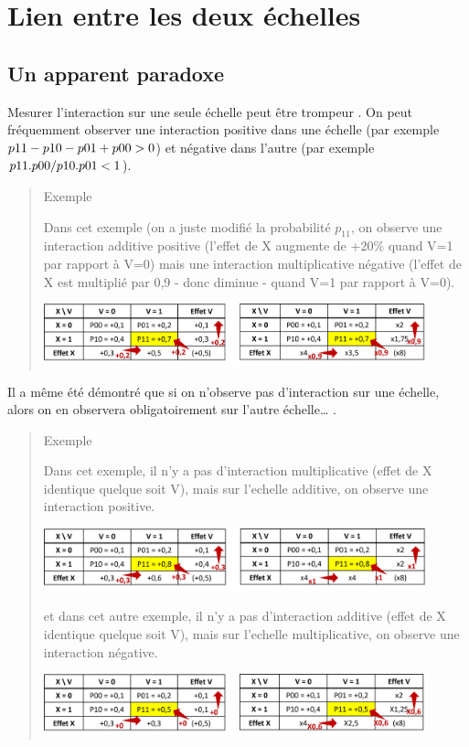 \documentclass[
]{book}
\begin{document}
\hypertarget{lien-entre-les-deux-uxe9chelles}{%
\section{Lien entre les deux échelles}\label{lien-entre-les-deux-uxe9chelles}}

\hypertarget{un-apparent-paradoxe}{%
\subsection*{Un apparent paradoxe}\label{un-apparent-paradoxe}}

Mesurer l'interaction sur une seule échelle peut être trompeur \citet{mathur2018r}. On peut fréquemment observer une interaction positive dans une échelle (par exemple \(\small p11 - p10 - p01 + p00 > 0\)) et négative dans l'autre (par exemple \(\small p11.p00 / p10.p01 <1\)).

\begin{quote}
Exemple

Dans cet exemple (on a juste modifié la probabilité \(p_{11}\), on observe une interaction additive positive (l'effet de X augmente de +20\% quand V=1 par rapport à V=0) mais une interaction multiplicative négative (l'effet de X est multiplié par 0,9 - donc diminue - quand V=1 par rapport à V=0).

\includegraphics[width=0.9\textwidth,height=\textheight]{img/Image4.png}
\end{quote}

Il a même été démontré que si on n'observe pas d'interaction sur une échelle, alors on en observera obligatoirement sur l'autre échelle\ldots{} \citet{vanderweele_tutorial_2014}.

\begin{quote}
Exemple

Dans cet exemple, il n'y a pas d'interaction multiplicative (effet de X identique quelque soit V), mais sur l'echelle additive, on observe une interaction positive.

\includegraphics[width=0.9\textwidth,height=\textheight]{img/Image5.png}

et dans cet autre exemple, il n'y a pas d'interaction additive (effet de X identique quelque soit V), mais sur l'echelle multiplicative, on observe une interaction négative.

\includegraphics[width=0.9\textwidth,height=\textheight]{img/Image5b.png}
\end{quote}
\end{document}
